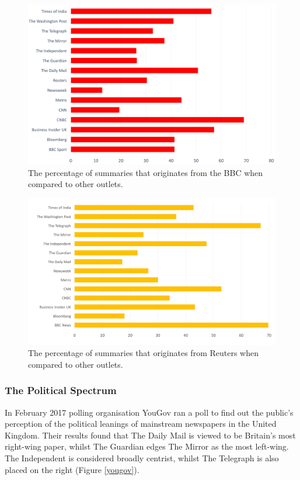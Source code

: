 \documentclass[12pt]{article}
\begin{document}
\begin{figure}[ht!]
  \centering
    \includegraphics[scale=0.15]{bbc-news.png}
   \caption[A graph depicting responses to the User Interface Survey]{The percentage of summaries that originates from the BBC when compared to other outlets.}
   \label{bbc-news}
\end{figure} 

\begin{figure}[ht!]
  \centering
    \includegraphics[scale=0.15]{reuters.png}
   \caption[A graph depicting responses to the User Interface Survey]{The percentage of summaries that originates from Reuters when compared to other outlets.}
   \label{reuters}
\end{figure} 

\subsubsection{The Political Spectrum}

In February 2017 polling organisation YouGov ran a poll to find out the public's perception of the political leanings of mainstream newspapers in the United Kingdom. Their results found that The Daily Mail is viewed to be Britain's most right-wing paper, whilst The Guardian edges The Mirror as the most left-wing. The Independent is considered broadly centrist, whilst The Telegraph is also placed on the right (Figure \ref{yougov}). 
\end{document}
